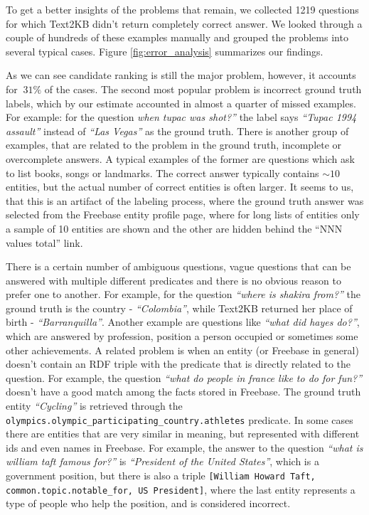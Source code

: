 To get a better insights of the problems that remain, we collected 1219 questions for which Text2KB didn't return completely correct answer.
We looked through a couple of hundreds of these examples manually and grouped the problems into several typical cases.
Figure \ref{fig:error_analysis} summarizes our findings.

As we can see candidate ranking is still the major problem, however, it accounts for $~31\%$ of the cases.
The second most popular problem is incorrect ground truth labels, which by our estimate accounted in almost a quarter of missed examples.
For example: for the question \textit{when tupac was shot?''} the label says \textit{``Tupac 1994 assault''} instead of \textit{``Las Vegas''} as the ground truth.
There is another group of examples, that are related to the problem in the ground truth, \ie incomplete or overcomplete answers.
A typical examples of the former are questions which ask to list books, songs or landmarks.
The correct answer typically contains $\sim10$ entities, but the actual number of correct entities is often larger.
It seems to us, that this is an artifact of the labeling process, where the ground truth answer was selected from the Freebase entity profile page, where for long lists of entities only a sample of 10 entities are shown and the other are hidden behind the ``NNN values total'' link.

There is a certain number of ambiguous questions, \ie vague questions that can be answered with multiple different predicates and there is no obvious reason to prefer one to another.
For example, for the question \textit{``where is shakira from?''} the ground truth is the country - \textit{``Colombia''}, while Text2KB returned her place of birth - \textit{``Barranquilla''}.
Another example are questions like \textit{``what did hayes do?''}, which are answered by profession, position a person occupied or sometimes some other achievements.
A related problem is when an entity (or Freebase in general) doesn't contain an RDF triple with the predicate that is directly related to the question.
For example, the question \textit{``what do people in france like to do for fun?''} doesn't have a good match among the facts stored in Freebase.
The ground truth entity \textit{``Cycling''} is retrieved through the \texttt{olympics.olympic\_participating\_country.athletes} predicate.
In some cases there are entities that are very similar in meaning, but represented with different ids and even names in Freebase.
For example, the answer to the question \textit{``what is william taft famous for?''} is \textit{``President of the United States''}, which is a government position, but there is also a triple \texttt{[William Howard Taft, common.topic.notable\_for, US President]}, where the last entity represents a type of people who help the position, and is considered incorrect.

